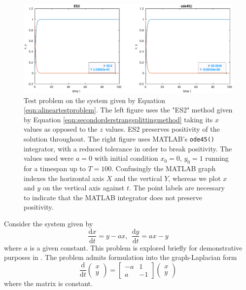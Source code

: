 \begin{figure}
    \centering
    \includegraphics[width = \linewidth]{Matlab/linearproblempositivity.eps}
    \caption{
        Test problem on the system given by Equation \ref{eqn:alineartestproblem}.
        The left figure uses the "ES2" method given by Equation \ref{eqn:secondorderstrangsplittingmethod} taking its $x$ values as opposed to the $z$ values.
        ES2 preserves positivity of the solution throughout.
        The right figure uses MATLAB's \texttt{ode45()} integrator, with a reduced tolerance in order to break positivity.
        The values used were $a=0$ with initial condition $x_0 = 0$, $y_0 = 1$ running for a timespan up to $T = 100$.
        Confusingly the MATLAB graph indexes the horizontal axis $X$ and the vertical $Y$, whereas we plot $x$ and $y$ on the vertical axis against $t$.
        The point labels are necessary to indicate that the MATLAB integrator does not preserve positivity.
    }
    \label{fig:breakposlin}
\end{figure}

Consider the system given by
\begin{equation}
    \frac{\mathrm{d}x}{\mathrm{d}t} = y - ax,~~ \frac{\mathrm{d}y}{\mathrm{d}t} = ax - y
    \label{eqn:alineartestproblem}
\end{equation}
where $a$ is a given constant. This problem is explored briefly for demonstrative purposes in \cite{broekhuizen_biochem_2008}.
The problem admits formulation into the graph-Laplacian form
\begin{equation*}
    \frac{\mathrm{d}}{\mathrm{d}t}\begin{pmatrix}
        x \\
        y
    \end{pmatrix} = \begin{bmatrix}
        -a & 1 \\
        a & -1
    \end{bmatrix} \begin{pmatrix}
        x \\
        y
    \end{pmatrix}
\end{equation*}
where the matrix is constant.

